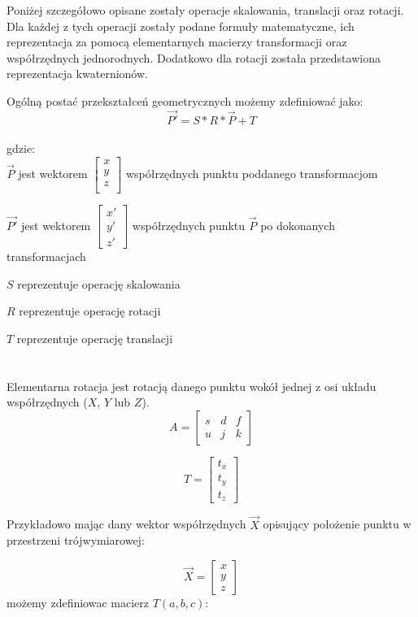 \documentclass[licencjacka]{pracamgr}
\begin{document}
Poniżej szczegółowo opisane zostały operacje skalowania, translacji oraz rotacji. Dla każdej z tych operacji zostały podane formuły matematyczne, ich reprezentacja za pomocą elementarnych macierzy transformacji oraz współrzędnych jednorodnych. Dodatkowo dla rotacji została przedstawiona reprezentacja kwaternionów.

\iffalse
Ogólną postać przekształceń geometrycznych możemy zdefiniować jako:
$$
\vec{P'}=S*R*\vec{P}+T
$$
\\
gdzie:
\\

$\vec{P}$ jest wektorem $\begin{bmatrix} x \\y \\z \\ \end{bmatrix}$ współrzędnych punktu poddanego transformacjom

$\vec{P'}$ jest wektorem $\begin{bmatrix} x'\\ y'\\ z' \end{bmatrix} $ współrzędnych punktu $\vec{P}$ po dokonanych transformacjach

$S$ reprezentuje operację skalowania

$R$ reprezentuje operację rotacji

$T$ reprezentuje operację translacji
\\
\\
\\
Elementarna rotacja jest rotacją danego punktu wokół jednej z osi układu współrzędnych ($X$, $Y$ lub $Z$).
$$
A=\begin{bmatrix}
s & d & f \\
u & j & k
\end{bmatrix}
$$


$$
T=\begin{bmatrix}
t_x \\
t_y \\
t_z
\end{bmatrix}
$$

Przykładowo mając dany wektor współrzędnych $\vec{X}$ opisujący położenie punktu w przestrzeni trójwymiarowej:

$$
\vec{X}=\begin{bmatrix}
x \\
y \\
z
\end{bmatrix}
$$
możemy zdefiniowac macierz $T(a,b,c)$:
\end{document}
